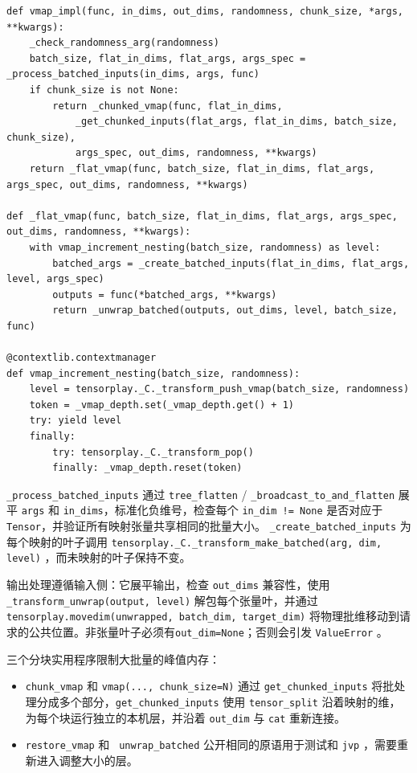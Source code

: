 \begin{lstlisting}[caption={\texttt{vmap\_impl} and nesting.}, label=lst:vmapimpl, style=pystyle]
def vmap_impl(func, in_dims, out_dims, randomness, chunk_size, *args, **kwargs):
    _check_randomness_arg(randomness)
    batch_size, flat_in_dims, flat_args, args_spec = _process_batched_inputs(in_dims, args, func)
    if chunk_size is not None:
        return _chunked_vmap(func, flat_in_dims,
            _get_chunked_inputs(flat_args, flat_in_dims, batch_size, chunk_size),
            args_spec, out_dims, randomness, **kwargs)
    return _flat_vmap(func, batch_size, flat_in_dims, flat_args, args_spec, out_dims, randomness, **kwargs)

def _flat_vmap(func, batch_size, flat_in_dims, flat_args, args_spec, out_dims, randomness, **kwargs):
    with vmap_increment_nesting(batch_size, randomness) as level:
        batched_args = _create_batched_inputs(flat_in_dims, flat_args, level, args_spec)
        outputs = func(*batched_args, **kwargs)
        return _unwrap_batched(outputs, out_dims, level, batch_size, func)

@contextlib.contextmanager
def vmap_increment_nesting(batch_size, randomness):
    level = tensorplay._C._transform_push_vmap(batch_size, randomness)
    token = _vmap_depth.set(_vmap_depth.get() + 1)
    try: yield level
    finally:
        try: tensorplay._C._transform_pop()
        finally: _vmap_depth.reset(token)
\end{lstlisting}

\texttt{\_process\_batched\_inputs} 通过 \texttt{tree\_flatten} / \texttt{\_broadcast\_to\_and\_flatten} 展平 \texttt{args} 和 \texttt{in\_dims}，标准化负维号，检查每个 \texttt{in\_dim != None} 是否对应于 \texttt{Tensor}，并验证所有映射张量共享相同的批量大小。 \texttt{\_create\_batched\_inputs} 为每个映射的叶子调用 \texttt{tensorplay.\_C.\_transform\_make\_batched(arg, dim, level)} ，而未映射的叶子保持不变。

输出处理遵循输入侧：它展平输出，检查 \texttt{out\_dims} 兼容性，使用 \texttt{\_transform\_unwrap(output, level)} 解包每个张量叶，并通过 \texttt{tensorplay.movedim(unwrapped, batch\_dim, target\_dim)} 将物理批维移动到请求的公共位置。非张量叶子必须有\texttt{out\_dim=None}；否则会引发 \texttt{ValueError} 。

三个分块实用程序限制大批量的峰值内存：
\begin{itemize}[leftmargin=1.2em]
\item \texttt{chunk\_vmap} 和 \texttt{vmap(..., chunk\_size=N)} 通过 \texttt{get\_chunked\_inputs} 将批处理分成多个部分，\texttt{get\_chunked\_inputs} 使用 \texttt{tensor\_split} 沿着映射的维，为每个块运行独立的本机层，并沿着 \texttt{out\_dim} 与 \texttt{cat} 重新连接。
\item \texttt{restore\_vmap} 和 \texttt{ unwrap\_batched} 公开相同的原语用于测试和 \texttt{jvp} ，需要重新进入调整大小的层。
\end{itemize}

